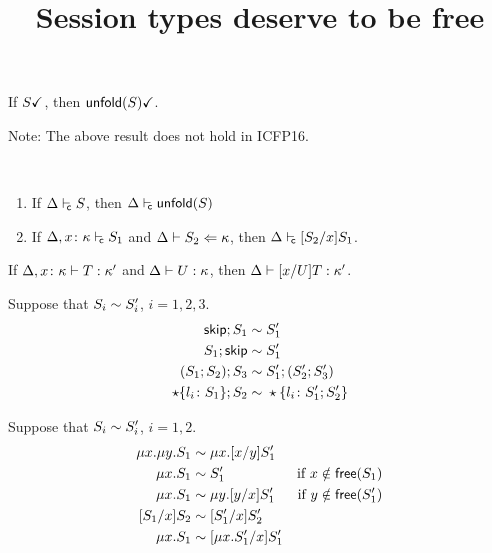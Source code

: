 \documentclass{article}
\title{Session types deserve to be free}
\begin{document}



\begin{lemma}
  If $\done S$, then $\done{\unfoldk(S)}$.  
\end{lemma}

Note: The above result does not hold in ICFP16.

\begin{lemma}\
  \begin{enumerate}
  \item If $\isContr S$, then $\isContr{\unfoldk(S)}$
  \item If $\isContr[\Delta,x\colon\kind]{S_1}$ and $\algkindin {S_2} \kind$,
    then $\isContr{\subs{S_2}{x}{S_1}}$.
  \end{enumerate}
\end{lemma}




\begin{lemma}
  If $\isType[\Delta,x\colon\kind] T\kind'$ and $\isType U\kind$, then
  $\isType{\subs xUT}{\kind'}$.
\end{lemma}


\begin{lemma}
  \label{lemma:seq-laws}
  Suppose that $S_i \TypeEquiv S'_i$, $i=1,2,3$.
  \begin{align*}
    \skipk;S_1 \TypeEquiv&\; S'_1
    \\
    S_1;\skipk \TypeEquiv&\; S_1'
    \\
    (S_1;S_2);S_3 \TypeEquiv&\; S'_1;(S'_2;S'_3)
    \\
    \star\{l_i\colon S_1\};S_2 \TypeEquiv&\; \star\{l_i\colon S'_1;S'_2\}
  \end{align*}
\end{lemma}

\begin{lemma}
\label{lemma:mu-laws}
  Suppose that $S_i \TypeEquiv S'_i$, $i=1,2$.
  \begin{align*}
    \mu x. \mu y. S_1 \TypeEquiv&\; \mu x. \subs xy{S_1'}
    \\
    \mu x.S_1 \TypeEquiv&\; S'_1 &\text{if } x \notin \free (S_1)
    \\
    \mu x.S_1 \TypeEquiv&\; \mu y.\subs yx{S_1'} &\text{if } y \notin \free (S'_1)
    \\
    \subs{S_1}{x}{S_2} \TypeEquiv&\; \subs{S_1'}{x}{S_2'}
    \\
    \mu x.S_1 \TypeEquiv&\; \subs{\mu x.S_1'}{x}{S_1'}
  \end{align*}
\end{lemma}

% 
% 
\end{document}

